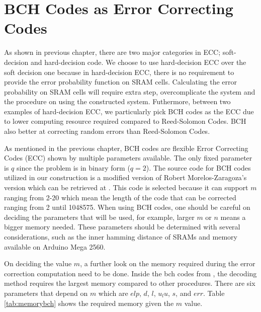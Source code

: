 \section{BCH Codes as Error Correcting Codes}\label{ch:bch}
As shown in previous chapter, there are two major categories in ECC; soft-decision and hard-decision code. We choose to use hard-decision ECC over the soft decision one because in hard-decision ECC, there is no requirement to provide the error probability function on SRAM cells. Calculating the error probability on SRAM cells will require extra step, overcomplicate the system and the procedure on using the constructed system.
Futhermore, between two examples of hard-decision ECC, we particularly pick BCH codes as the ECC due to lower computing resource required compared to Reed-Solomon Codes. BCH also better at correcting random errors than Reed-Solomon Codes.

As mentioned in the previous chapter, BCH codes are flexible Error Correcting Codes (ECC) shown by multiple parameters available. The only fixed parameter is $q$ since the problem is in binary form ($q=2$). The source code for BCH codes utilized in our construction is a modified version of Robert Morelos-Zaragoza's version which can be retrieved at \cite{bch_code}. This code is selected because it can support $m$ ranging from 2-20 which mean the length of the code that can be corrected ranging from 2 until 1048575. When using BCH codes, one should be careful on deciding the parameters that will be used, for example, larger $m$ or $n$ means a bigger memory needed.
These parameters should be determined with several considerations, such as the inner hamming distance of SRAMs and memory available on Arduino Mega 2560.

On deciding the value $m$, a further look on the memory required during the error correction computation need to be done. Inside the bch codes from \cite{bch_code}, the decoding method requires the largest memory compared to other procedures. There are six parameters that depend on $m$ which are $elp$, $d$, $l$, $u_lu$, $s$, and $err$. Table \ref{tab:memorybch} shows the required memory given the $m$ value.

